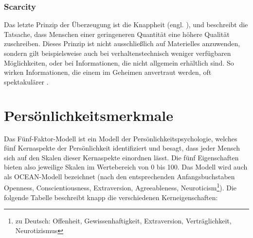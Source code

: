 \subsubsection{Scarcity}
Das letzte Prinzip der Überzeugung ist die Knappheit (engl. ), und beschreibt die Tatsache, dass Menschen einer geringeneren Quantität eine höhere Qualität zuschreiben.
Dieses Prinzip ist nicht ausschließlich auf Materielles anzuwenden, sondern gilt beispielsweise auch bei verhaltenstechnisch weniger verfügbaren Möglichkeiten, oder bei Informationen, die nicht allgemein erhältlich sind.
So wirken Informationen, die einem im Geheimen anvertraut werden, oft spektakulärer .

\section{Persönlichkeitsmerkmale}

Das Fünf-Faktor-Modell ist ein Modell der Persönlichkeitspsychologie, welches fünf Kernaspekte der Persönlichkeit identifiziert und besagt, dass jeder Mensch sich auf den Skalen dieser Kernaspekte einordnen lässt.
Die fünf Eigenschaften bieten also jeweilige Skalen im Wertebereich von 0 bis 100.
Das Modell wird auch als OCEAN-Modell bezeichnet (nach den entsprechenden Anfangsbuchstaben Openness, Conscientiousness, Extraversion, Agreeableness, Neuroticism\footnote{zu Deutsch: Offenheit, Gewissenhaftigkeit, Extraversion, Verträglichkeit, Neurotizismus}).
Die folgende Tabelle beschreibt knapp die verschiedenen Kerneigenschaften:

